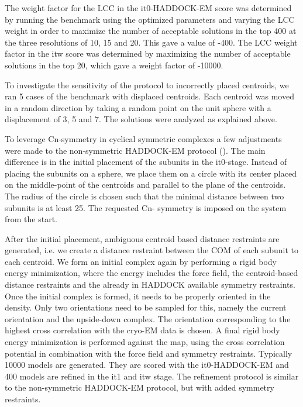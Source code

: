 The weight factor for the LCC in the it0-HADDOCK-EM score was determined by
running the benchmark using the optimized parameters and varying the LCC weight
in order to maximize the number of acceptable solutions in the top 400 at the
three resolutions of 10, 15 and 20\Angstrom. This gave a value of -400.  The
LCC weight factor in the itw score was determined by maximizing the number of
acceptable solutions in the top 20, which gave a weight factor of -10000.

To investigate the sensitivity of the protocol to incorrectly placed centroids,
we ran 5 cases of the benchmark with displaced centroids.  Each centroid was
moved in a random direction by taking a random point on the unit sphere with a
displacement of 3, 5 and 7\Angstrom.  The solutions were analyzed as explained
above.


To leverage Cn-symmetry in cyclical symmetric complexes a few adjustments were
made to the non-symmetric HADDOCK-EM protocol
().  The main difference is in the initial
placement of the subunits in the it0-stage.  Instead of placing the subunits on
a sphere, we place them on a circle with its center placed on the middle-point
of the centroids and parallel to the plane of the centroids.  The radius of the
circle is chosen such that the minimal distance between two subunits is at
least 25\Angstrom.  The requested Cn- symmetry is imposed on the system from
the start. 

After the initial placement, ambiguous centroid based distance restraints are
generated, i.e. we create a distance restraint between the COM of each subunit
to each centroid.  We form an initial complex again by performing a rigid body
energy minimization, where the energy includes the force field, the
centroid-based distance restraints and the already in HADDOCK available
symmetry restraints.  Once the initial complex is formed, it needs to be
properly oriented in the density.  Only two orientations need to be sampled for
this, namely the current orientation and the upside-down complex.  The
orientation corresponding to the highest cross correlation with the cryo-EM
data is chosen.  A final rigid body energy minimization is performed against
the map, using the cross correlation potential in combination with the force
field and symmetry restraints.  Typically 10000 models are generated.  They are
scored with the it0-HADDOCK-EM and 400 models are refined in the it1 and itw
stage.  The refinement protocol is similar to the non-symmetric HADDOCK-EM
protocol, but with added symmetry restraints.

